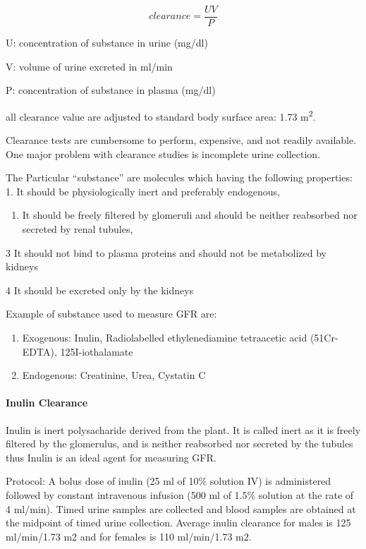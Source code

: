 \documentclass[
  letterpaper,
  DIV=11,
  numbers=noendperiod]{scrreprt}
\let\oldparagraph\paragraph
\renewcommand{\paragraph}[1]{\oldparagraph{#1}\mbox{}}
\providecommand{\tightlist}{%
  \setlength{\itemsep}{0pt}\setlength{\parskip}{0pt}}\usepackage{longtable,booktabs,array}
\begin{document}
\[
clearance = \frac{UV}{P}
\]

U: concentration of substance in urine (mg/dl)

V: volume of urine excreted in ml/min

P: concentration of substance in plasma (mg/dl)

all clearance value are adjusted to standard body surface area: 1.73
m\textsuperscript{2}.

Clearance tests are cumbersome to perform, expensive, and not readily
available. One major problem with clearance studies is incomplete urine
collection.

The Particular ``substance'' are molecules which having the following
properties: 1. It should be physiologically inert and preferably
endogenous,

\begin{enumerate}
\def\labelenumi{\arabic{enumi}.}
\setcounter{enumi}{1}
\tightlist
\item
  It should be freely filtered by glomeruli and should be neither
  reabsorbed nor secreted by renal tubules,
\end{enumerate}

3 It should not bind to plasma proteins and should not be metabolized by
kidneys

4 It should be excreted only by the kidneys

Example of substance used to measure GFR are:

\begin{enumerate}
\def\labelenumi{\arabic{enumi}.}
\item
  Exogenous: Inulin, Radiolabelled ethylenediamine tetraacetic acid
  (51Cr- EDTA), 125I-iothalamate
\item
  Endogenous: Creatinine, Urea, Cystatin C
\end{enumerate}

\paragraph{Inulin Clearance}\label{inulin-clearance}

Inulin is inert polysacharide derived from the plant. It is called inert
as it is freely filtered by the glomerulus, and is neither reabsorbed
nor secreted by the tubules thus Inulin is an ideal agent for measuring
GFR.

Protocol: A bolus dose of inulin (25 ml of 10\% solution IV) is
administered followed by constant intravenous infusion (500 ml of 1.5\%
solution at the rate of 4 ml/min). Timed urine samples are collected and
blood samples are obtained at the midpoint of timed urine collection.
Average inulin clearance for males is 125 ml/min/1.73 m2 and for females
is 110 ml/min/1.73 m2.
\end{document}

